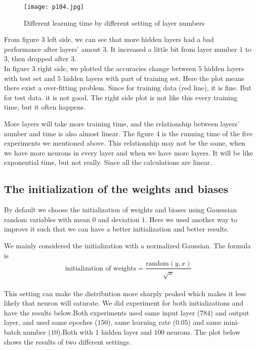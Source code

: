 \documentclass[12pt,a4paper]{article}
\begin{document}
\begin{figure}
\centering
\texttt{[image: p104.jpg]}
\caption{Different learning time by different setting of layer numbers}
\end{figure}

From figure 3 left side, we can see that more hidden layers had a bad performance after layers' amout $3$. It increased a little bit from layer number $1$ to $3$, then dropped after $3$.\\
In figure 3 right side, we plotted the accuracies change between $5$ hidden layers with test set and $5$ hidden layers with part of training set. Here the plot means there exist a over-fitting problem. Since for training data (red line), it is fine. But for test data. it is not good. The right side plot is not like this every training time, but it often happens.


More layers will take more training time, and the relationship between layers' number and time is also almost linear. The figure 4 is the running time of the five experiments we mentioned above. This relationship may not be the same, when we have more neurons in every layer and when we have more layers. It will be like exponential time, but not really. Since all the calculations are linear.\\

\subsection{The initialization of the weights and biases}
By default we choose the initialization of weights and biases using Gausssian random variables with mean $0$ and deviation $1$. Here we used another way to improve it such that we can have a better initialization and better results.

We mainly considered the initialization with a normalized Gaussian. The formula is\\
\[\text{initialization of weights}= \frac{\text{random} (y, x)}{\sqrt{x}}\]\\
This setting can make the distribution more sharply peaked which makes it less likely that neuron will saturate. We did experiment for both initializations and have the results below.Both experiments used same input layer ($784$) and output layer, and used same epoches ($150$), same learning rate ($0.05$) and same mini-batch number ($10$).Both with $1$ hidden layer and $100$ neurons. The plot below shows the results of two different settings.\\
\end{document}
